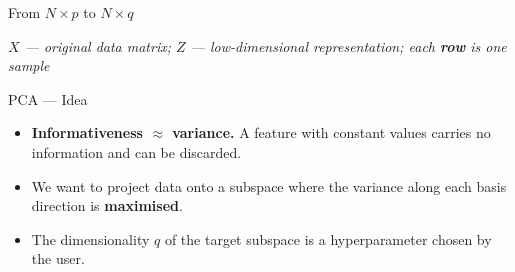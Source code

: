 \documentclass[aspectratio=169,t]{beamer}
\begin{document}
\begin{frame}{From $N \times p$ to $N \times q$}
\begin{center}
\begin{tikzpicture}[x=1cm, y=1cm]
  \end{tikzpicture}
  \end{center}
  \vspace{0.15cm}
  \begin{center}
    {\small\itshape
      $X$ --- original data matrix;\quad
      $Z$ --- low-dimensional representation;\quad
      each \textbf{row} is one sample}
  \end{center}
\end{frame}



\begin{frame}{PCA --- Idea}
  \begin{itemize}
    \setlength{\itemsep}{0.4cm}
    \item \textbf{Informativeness $\approx$ variance.}
          A feature with constant values carries no information and can be discarded.
    \item We want to project data onto a subspace where the variance along
          each basis direction is \textbf{maximised}.
    \item The dimensionality $q$ of the target subspace is a hyperparameter
          chosen by the user.
  \end{itemize}
\end{frame}
\end{document}
